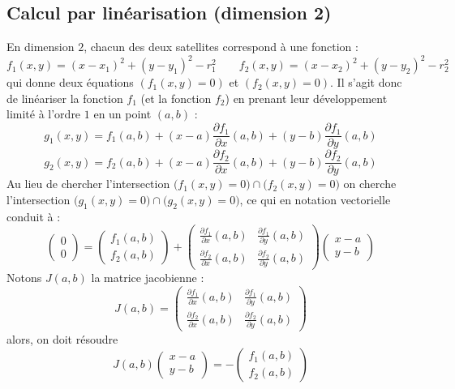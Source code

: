 \documentclass[class=report,crop=false]{standalone}
\begin{document}
\subsection{Calcul par linéarisation (dimension 2)}

En dimension $2$, chacun des deux satellites correspond à une fonction  :
$$f_1(x,y) = (x-x_1)^2+(y-y_1)^2-r_1^2 \qquad f_2(x,y) = (x-x_2)^2+(y-y_2)^2-r_2^2$$
qui donne deux équations $(f_1(x,y)=0)$ et $(f_2(x,y)=0)$.
Il s'agit donc de linéariser la fonction $f_1$ (et la fonction $f_2$)
en prenant leur développement limité à l'ordre $1$ en un point $(a,b)$  :
$$g_1(x,y) = f_1(a,b) + (x-a) \frac{\partial f_1}{\partial x}(a,b)+ (y-b) \frac{\partial f_1}{\partial y}(a,b)$$
$$g_2(x,y) = f_2(a,b) + (x-a) \frac{\partial f_2}{\partial x}(a,b)+ (y-b) \frac{\partial f_2}{\partial y}(a,b)$$
Au lieu de chercher l'intersection $\big(f_1(x,y)=0\big) \cap\big(f_2(x,y)=0\big)$
on cherche l'intersection $\big(g_1(x,y)=0\big) \cap \big(g_2(x,y)=0\big)$, ce qui en notation vectorielle conduit à :
$$\begin{pmatrix}0\\0\end{pmatrix}
= \begin{pmatrix}f_1(a,b)\\f_2(a,b)\end{pmatrix}
+ \begin{pmatrix}
  \frac{\partial f_1}{\partial x}(a,b) & \frac{\partial f_1}{\partial y}(a,b) \\
  \frac{\partial f_2}{\partial x}(a,b) & \frac{\partial f_2}{\partial y}(a,b)
  \end{pmatrix}
\begin{pmatrix}x-a\\y-b\end{pmatrix}$$
Notons $J(a,b)$ la matrice jacobienne  :
$$J(a,b) = \begin{pmatrix}
  \frac{\partial f_1}{\partial x}(a,b) & \frac{\partial f_1}{\partial y}(a,b) \\
  \frac{\partial f_2}{\partial x}(a,b) & \frac{\partial f_2}{\partial y}(a,b)
  \end{pmatrix}$$
alors, on doit résoudre 
$$J(a,b) \begin{pmatrix}x-a\\y-b\end{pmatrix} = - \begin{pmatrix}f_1(a,b)\\f_2(a,b)\end{pmatrix}$$
\end{document}
